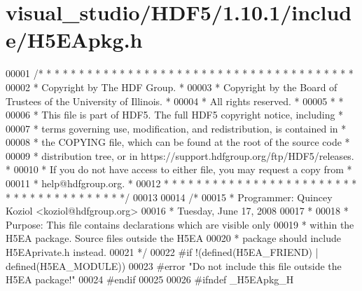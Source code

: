 \hypertarget{visual__studio_2_h_d_f5_21_810_81_2include_2_h5_e_apkg_8h_source}{}\section{visual\+\_\+studio/\+H\+D\+F5/1.10.1/include/\+H5\+E\+Apkg.h}
\label{visual__studio_2_h_d_f5_21_810_81_2include_2_h5_e_apkg_8h_source}

\begin{DoxyCode}
00001 \textcolor{comment}{/* * * * * * * * * * * * * * * * * * * * * * * * * * * * * * * * * * * * * * *}
00002 \textcolor{comment}{ * Copyright by The HDF Group.                                               *}
00003 \textcolor{comment}{ * Copyright by the Board of Trustees of the University of Illinois.         *}
00004 \textcolor{comment}{ * All rights reserved.                                                      *}
00005 \textcolor{comment}{ *                                                                           *}
00006 \textcolor{comment}{ * This file is part of HDF5.  The full HDF5 copyright notice, including     *}
00007 \textcolor{comment}{ * terms governing use, modification, and redistribution, is contained in    *}
00008 \textcolor{comment}{ * the COPYING file, which can be found at the root of the source code       *}
00009 \textcolor{comment}{ * distribution tree, or in https://support.hdfgroup.org/ftp/HDF5/releases.  *}
00010 \textcolor{comment}{ * If you do not have access to either file, you may request a copy from     *}
00011 \textcolor{comment}{ * help@hdfgroup.org.                                                        *}
00012 \textcolor{comment}{ * * * * * * * * * * * * * * * * * * * * * * * * * * * * * * * * * * * * * * */}
00013 
00014 \textcolor{comment}{/*}
00015 \textcolor{comment}{ * Programmer:      Quincey Koziol <koziol@hdfgroup.org>}
00016 \textcolor{comment}{ *                  Tuesday, June 17, 2008}
00017 \textcolor{comment}{ *}
00018 \textcolor{comment}{ * Purpose:         This file contains declarations which are visible only}
00019 \textcolor{comment}{ *                  within the H5EA package.  Source files outside the H5EA}
00020 \textcolor{comment}{ *                  package should include H5EAprivate.h instead.}
00021 \textcolor{comment}{ */}
00022 \textcolor{preprocessor}{#if !(defined(H5EA\_FRIEND) | defined(H5EA\_MODULE))}
00023 \textcolor{preprocessor}{#error "Do not include this file outside the H5EA package!"}
00024 \textcolor{preprocessor}{#endif}
00025 
00026 \textcolor{preprocessor}{#ifndef \_H5EApkg\_H}

\end{DoxyCode}
